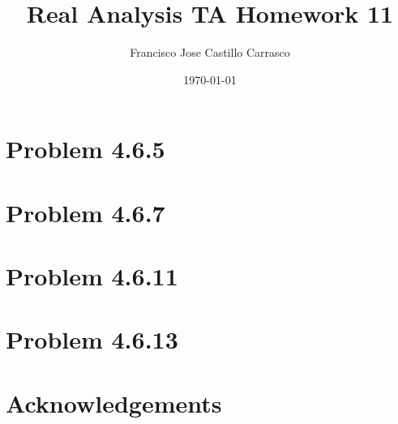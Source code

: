 




\title{Real Analysis TA Homework 11}
\author{Francisco Jose Castillo Carrasco}
\date{\today}
\maketitle




\section{Problem 4.6.5}

\newpage
\section{Problem 4.6.7}


\section{Problem 4.6.11}


\section{Problem 4.6.13}


\section*{Acknowledgements}






